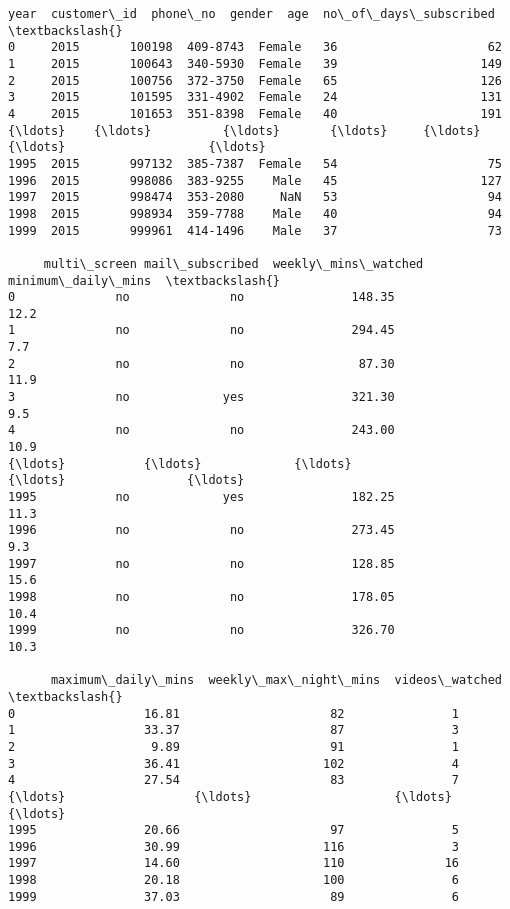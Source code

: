 \documentclass[11pt]{article}
\makeatletter
\newcommand{\boxspacing}{\kern\kvtcb@left@rule\kern\kvtcb@boxsep}
\newcommand{\prompt}[4]{
        {\ttfamily\llap{{\color{#2}[#3]:\hspace{3pt}#4}}\vspace{-\baselineskip}}
    }
\makeatother
\begin{document}
            \begin{tcolorbox}[breakable, size=fbox, boxrule=.5pt, pad at break*=1mm, opacityfill=0]
\prompt{Out}{outcolor}{17}{\boxspacing}
\begin{Verbatim}[commandchars=\\\{\}]
      year  customer\_id  phone\_no  gender  age  no\_of\_days\_subscribed  \textbackslash{}
0     2015       100198  409-8743  Female   36                     62
1     2015       100643  340-5930  Female   39                    149
2     2015       100756  372-3750  Female   65                    126
3     2015       101595  331-4902  Female   24                    131
4     2015       101653  351-8398  Female   40                    191
{\ldots}    {\ldots}          {\ldots}       {\ldots}     {\ldots}  {\ldots}                    {\ldots}
1995  2015       997132  385-7387  Female   54                     75
1996  2015       998086  383-9255    Male   45                    127
1997  2015       998474  353-2080     NaN   53                     94
1998  2015       998934  359-7788    Male   40                     94
1999  2015       999961  414-1496    Male   37                     73

     multi\_screen mail\_subscribed  weekly\_mins\_watched  minimum\_daily\_mins  \textbackslash{}
0              no              no               148.35                12.2
1              no              no               294.45                 7.7
2              no              no                87.30                11.9
3              no             yes               321.30                 9.5
4              no              no               243.00                10.9
{\ldots}           {\ldots}             {\ldots}                  {\ldots}                 {\ldots}
1995           no             yes               182.25                11.3
1996           no              no               273.45                 9.3
1997           no              no               128.85                15.6
1998           no              no               178.05                10.4
1999           no              no               326.70                10.3

      maximum\_daily\_mins  weekly\_max\_night\_mins  videos\_watched  \textbackslash{}
0                  16.81                     82               1
1                  33.37                     87               3
2                   9.89                     91               1
3                  36.41                    102               4
4                  27.54                     83               7
{\ldots}                  {\ldots}                    {\ldots}             {\ldots}
1995               20.66                     97               5
1996               30.99                    116               3
1997               14.60                    110              16
1998               20.18                    100               6
1999               37.03                     89               6


\end{Verbatim}
\end{tcolorbox}
\end{document}
